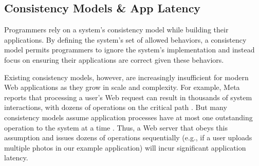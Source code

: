 
\subsection{Consistency Models \& App Latency}

Programmers rely on a system's consistency model while building their applications. By defining the system's set of allowed behaviors, a consistency model permits programmers to ignore the system's implementation and instead focus on ensuring their applications are correct given these behaviors.


Existing consistency models, however, are increasingly insufficient for modern Web applications as they grow in scale and complexity. For example, Meta reports that processing a user's Web request can result in thousands of system interactions, with dozens of operations on the critical path \cite{ajoux2015challenges,dean2013tail}. But many consistency models assume application processes have at most one outstanding operation to the system at a time \cite{ahamad1995causal,herlihy1990linearizability}. Thus, a Web server that obeys this assumption and issues dozens of operations sequentially
(e.g., if a user uploads multiple photos in our example application)
will incur significant application latency.

